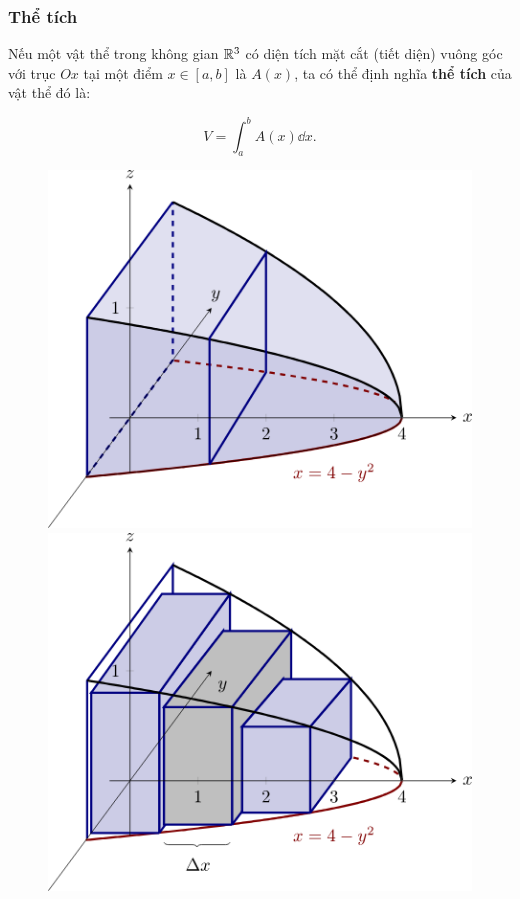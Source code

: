 \subsubsection{Thể tích}
Nếu một vật thể trong không gian $\mathbb{R}^3$ có diện tích mặt cắt (tiết diện) vuông góc với trục $Ox$ tại một điểm $x \in [a, b]$ là $A(x)$, ta có thể định nghĩa \textbf{thể tích} của vật thể đó là:
\begin{importantbox}
    \[ V = \int_a^b A(x) \dd x. \]
\end{importantbox}

\begin{figure}[H]
    \centering
    \begin{minipage}{0.45\textwidth}
        \centering
        \includegraphics[width=\textwidth]{figures/accumulated_cross_sections_1.png}
    \end{minipage}
    \vspace{1em}
    \begin{minipage}{0.45\textwidth}
        \centering
        \includegraphics[width=\textwidth]{figures/accumulated_cross_sections_2.png}

\end{minipage}
\end{figure}
